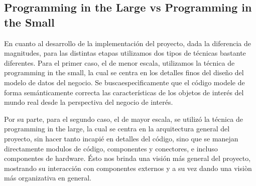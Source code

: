 \subsection{Programming in the Large vs Programming in the Small}
En cuanto al desarrollo de la implementación del proyecto, dada la diferencia de magnitudes, para las distintas etapas utilizamos dos tipos de técnicas bastante diferentes. Para el primer caso, el de menor escala, utilizamos la técnica de programming in the small, la cual se centra en los detalles finos del diseño del modelo de datos del negocio. Se buscaespecìficamente que el código modele de forma semánticamente correcta las características de los objetos de interés del mundo real desde la perspectiva del negocio de interés.

Por su parte, para el segundo caso, el de mayor escala, se utilizó la técnica de programming in the large, la cual se centra en la arquitectura general del proyecto, sin hacer tanto incapié en detalles del código, sino que se manejan directamente modulos de código, componentes y conectores, e incluso componentes de hardware. Ésto nos brinda una visión más general del proyecto, mostrando su interacción con componentes externos y a su vez dando una visiòn más organizativa en general.